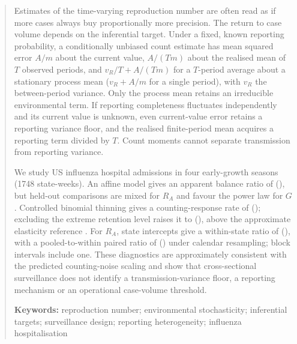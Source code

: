 \begin{abstract}
Estimates of the time-varying reproduction number are often read as if more cases always buy proportionally more precision. The return to case volume depends on the inferential target. Under a fixed, known reporting probability, a conditionally unbiased count estimate has mean squared error $A/m$ about the current value, $A/(Tm)$ about the realised mean of $T$ observed periods, and $v_R/T+A/(Tm)$ for a $T$-period average about a stationary process mean ($v_R+A/m$ for a single period), with $v_R$ the between-period variance. Only the process mean retains an irreducible environmental term. If reporting completeness fluctuates independently and its current value is unknown, even current-value error retains a reporting variance floor, and the realised finite-period mean acquires a reporting term divided by $T$. Count moments cannot separate transmission from reporting variance.

We study US influenza hospital admissions in four early-growth seasons (1748 state-weeks). An affine model gives an apparent balance ratio of \RAratioPoint{} (\RAratioInterval{}), but held-out comparisons are mixed for $R_A$ and favour the power law for $G$. Controlled binomial thinning gives a counting-response rate of \ThinAllPoint{} (\ThinAllInterval{}); excluding the extreme retention level raises it to \ThinNoqPoint{} (\ThinNoqInterval{}), above the approximate elasticity reference \ThinBPPoint{}. For $R_A$, state intercepts give a within-state ratio of \FEratioPoint{} (\FEratioInterval{}), with a pooled-to-within paired ratio of \FEpairedPoint{} (\FEpairedInterval{}) under calendar resampling; block intervals include one. These diagnostics are approximately consistent with the predicted counting-noise scaling and show that cross-sectional surveillance does not identify a transmission-variance floor, a reporting mechanism or an operational case-volume threshold.

\medskip
\noindent\textbf{Keywords:} reproduction number; environmental stochasticity; inferential targets; surveillance design; reporting heterogeneity; influenza hospitalisation
\end{abstract}
